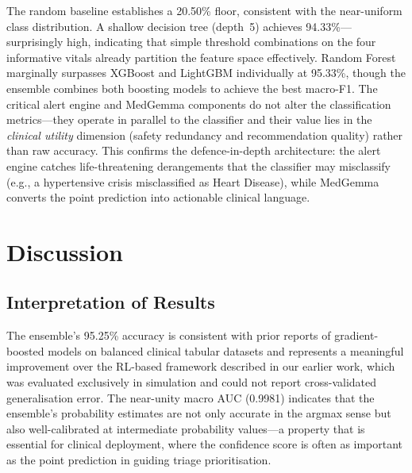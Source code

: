 \documentclass[journal]{IEEEtran}
\begin{document}
The random baseline establishes a 20.50\% floor, consistent with the
near-uniform class distribution. A shallow decision tree (depth~5)
achieves 94.33\%—surprisingly high, indicating that simple threshold
combinations on the four informative vitals already partition the
feature space effectively. Random Forest marginally surpasses XGBoost
and LightGBM individually at 95.33\%, though the ensemble combines both
boosting models to achieve the best macro-F1. The critical alert engine
and MedGemma components do not alter the classification metrics—they
operate in parallel to the classifier and their value lies in the
\textit{clinical utility} dimension (safety redundancy and recommendation
quality) rather than raw accuracy. This confirms the defence-in-depth
architecture: the alert engine catches life-threatening derangements
that the classifier may misclassify (e.g., a hypertensive crisis
misclassified as Heart Disease), while MedGemma converts the point
prediction into actionable clinical language.

\section{Discussion}
\label{sec:discussion}

\subsection{Interpretation of Results}

The ensemble's 95.25\% accuracy is consistent with prior reports of
gradient-boosted models on balanced clinical tabular datasets and
represents a meaningful improvement over the RL-based framework described
in our earlier work, which was evaluated exclusively in simulation and
could not report cross-validated generalisation error. The near-unity
macro AUC (0.9981) indicates that the ensemble's probability estimates are
not only accurate in the argmax sense but also well-calibrated at
intermediate probability values—a property that is essential for clinical
deployment, where the confidence score is often as important as the point
prediction in guiding triage prioritisation.
\end{document}
